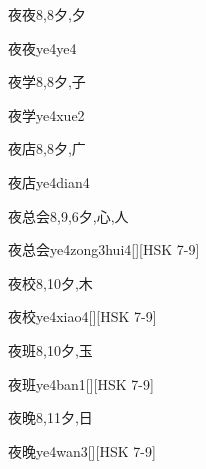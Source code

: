 \begin{Entry}{夜夜}{8,8}{⼣,⼣}
  \begin{Phonetics}{夜夜}{ye4ye4}
  \end{Phonetics}
\end{Entry}

\begin{Entry}{夜学}{8,8}{⼣,⼦}
  \begin{Phonetics}{夜学}{ye4xue2}
  \end{Phonetics}
\end{Entry}

\begin{Entry}{夜店}{8,8}{⼣,⼴}
  \begin{Phonetics}{夜店}{ye4dian4}
  \end{Phonetics}
\end{Entry}

\begin{Entry}{夜总会}{8,9,6}{⼣,⼼,⼈}
  \begin{Phonetics}{夜总会}{ye4zong3hui4}[][HSK 7-9]
  \end{Phonetics}
\end{Entry}

\begin{Entry}{夜校}{8,10}{⼣,⽊}
  \begin{Phonetics}{夜校}{ye4xiao4}[][HSK 7-9]
  \end{Phonetics}
\end{Entry}

\begin{Entry}{夜班}{8,10}{⼣,⽟}
  \begin{Phonetics}{夜班}{ye4ban1}[][HSK 7-9]
  \end{Phonetics}
\end{Entry}

\begin{Entry}{夜晚}{8,11}{⼣,⽇}
  \begin{Phonetics}{夜晚}{ye4wan3}[][HSK 7-9]
  \end{Phonetics}
\end{Entry}

